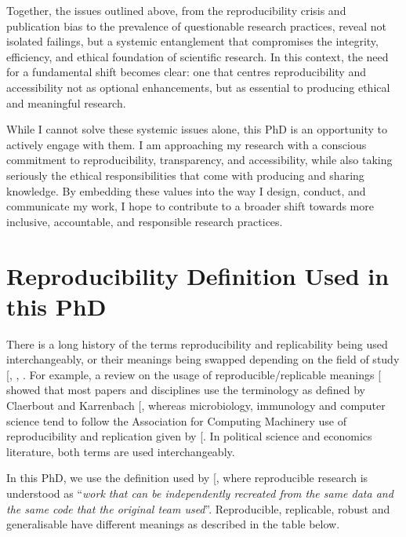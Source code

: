 \documentclass[
  11pt,
  letterpaper,
]{scrreprt}
\begin{document}
Together, the issues outlined above, from the reproducibility crisis and
publication bias to the prevalence of questionable research practices,
reveal not isolated failings, but a systemic entanglement that
compromises the integrity, efficiency, and ethical foundation of
scientific research. In this context, the need for a fundamental shift
becomes clear: one that centres reproducibility and accessibility not as
optional enhancements, but as essential to producing ethical and
meaningful research.

While I cannot solve these systemic issues alone, this PhD is an
opportunity to actively engage with them. I am approaching my research
with a conscious commitment to reproducibility, transparency, and
accessibility, while also taking seriously the ethical responsibilities
that come with producing and sharing knowledge. By embedding these
values into the way I design, conduct, and communicate my work, I hope
to contribute to a broader shift towards more inclusive, accountable,
and responsible research practices.

\section{Reproducibility Definition Used in this
PhD}\label{reproducibility-definition-used-in-this-phd}

There is a long history of the terms reproducibility and replicability
being used interchangeably, or their meanings being swapped depending on
the field of study
{[},
,
\citeproc{ref-plesser2018ReproducibilityVsReplicability}{354}{]}. For
example, a review on the usage of reproducible/replicable meanings
{[}\citeproc{ref-barba2018TerminologiesReproducibleResearch}{355}{]}
showed that most papers and disciplines use the terminology as defined
by Claerbout and Karrenbach
{[}\citeproc{ref-claerbout1992ElectronicDocumentsGive}{353}{]}, whereas
microbiology, immunology and computer science tend to follow the
Association for Computing Machinery use of reproducibility and
replication given by
{[}\citeproc{ref-ivie2018ReproducibilityScientificComputing}{90}{]}. In
political science and economics literature, both terms are used
interchangeably.

In this PhD, we use the definition used by
{[}\citeproc{ref-turingwaycommunity2019TuringWayHandbook}{356}{]}, where
reproducible research is understood as ``\emph{work that can be
independently recreated from the same data and the same code that the
original team used}''. Reproducible, replicable, robust and
generalisable have different meanings as described in the table below.
\end{document}
